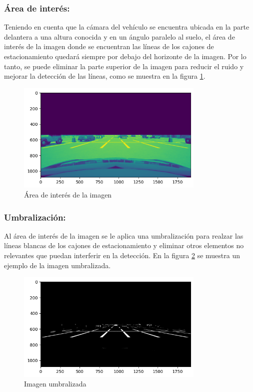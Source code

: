 \subsubsection{Área de interés:}
\noindent
Teniendo en cuenta que la cámara del vehículo se encuentra ubicada en la parte delantera a una altura conocida y en un ángulo paralelo al suelo, el área de interés de la imagen donde se encuentran las líneas de los cajones de estacionamiento quedará siempre por debajo del horizonte de la imagen.
Por lo tanto, se puede eliminar la parte superior de la imagen para
reducir el ruido y mejorar la detección de las líneas, como se muestra en la figura \ref{fig:roi}. \\
\begin{figure}[!ht]
    \centering
    \includegraphics[width=0.8\textwidth]{img/reticule/horizont}
    \caption{Área de interés de la imagen}
    \label{fig:roi}
\end{figure}

\subsubsection{Umbralización:}
\noindent
Al área de interés de la imagen se le aplica una umbralización para realzar las líneas blancas de los cajones de estacionamiento
y eliminar otros elementos no relevantes que puedan interferir en la detección.
En la figura \ref{fig:threshold} se muestra un ejemplo de la imagen umbralizada.
\begin{figure}[!ht]
    \centering
    \includegraphics[width=0.8\textwidth]{img/reticule/thresholded}
    \caption{Imagen umbralizada}
    \label{fig:threshold}
\end{figure}

